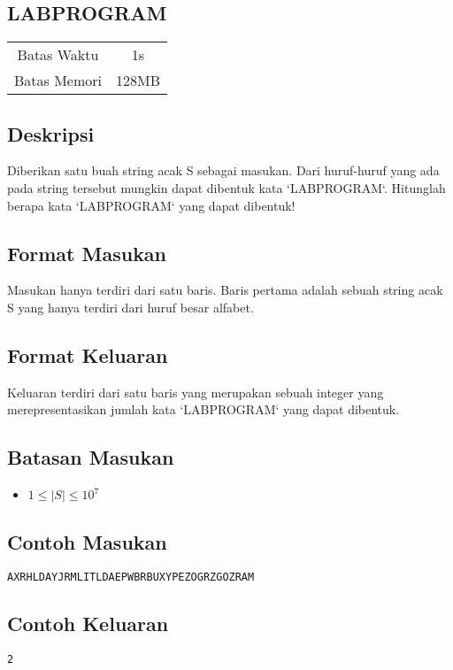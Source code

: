 \documentclass{article}
\begin{document}
\begin{center}
    \section*{LABPROGRAM} %

    \begin{tabular}{ | c c | }
        \hline
        Batas Waktu  & 1s \\    %
        Batas Memori & 128MB \\  %
        \hline
    \end{tabular}
\end{center}

\subsection*{Deskripsi}
Diberikan satu buah string acak S sebagai masukan. Dari huruf-huruf yang ada pada string tersebut mungkin dapat dibentuk kata `LABPROGRAM`. Hitunglah berapa kata `LABPROGRAM` yang dapat dibentuk!

\subsection*{Format Masukan}
Masukan hanya terdiri dari satu baris. Baris pertama adalah sebuah string acak S yang hanya terdiri dari huruf besar alfabet.

\subsection*{Format Keluaran}
Keluaran terdiri dari satu baris yang merupakan sebuah integer yang merepresentasikan jumlah kata `LABPROGRAM` yang dapat dibentuk.

\subsection*{Batasan Masukan}
\begin{itemize}
 \item $1 \leq |S|  \leq 10^7$
\end{itemize}

\begin{multicols}{2}
\subsection*{Contoh Masukan}
\begin{lstlisting}
AXRHLDAYJRMLITLDAEPWBRBUXYPEZOGRZGOZRAM
\end{lstlisting}
\null
\columnbreak
\subsection*{Contoh Keluaran}
\begin{lstlisting}
2
\end{lstlisting}
\vfill
\null
\end{multicols}
\end{document}
